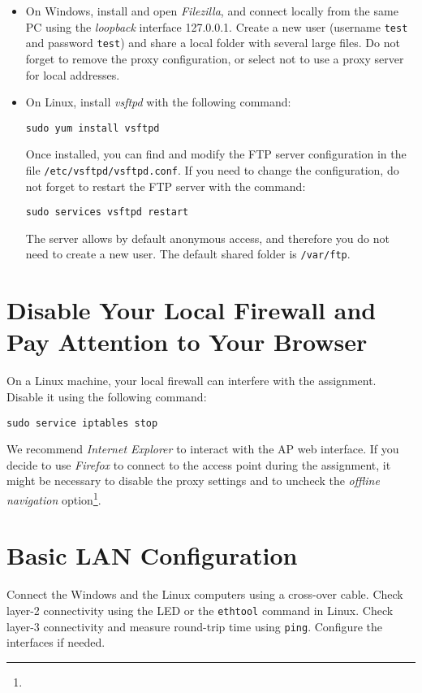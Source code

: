 \begin{itemize}

\item On Windows, install and open \emph{Filezilla}, and connect locally from the same PC using the \emph{loopback} interface 127.0.0.1. Create a new user (username \texttt{\color{blue}test} and password \texttt{\color{blue}test}) and share a local folder with several large files. Do not forget to remove the proxy configuration, or select not to use a proxy server for local addresses.

\item On Linux, install \emph{vsftpd} with the following command:
\begin{lstlisting}
sudo yum install vsftpd
\end{lstlisting}
    Once installed, you can find and modify the FTP server configuration in the file \texttt{/etc/vsftpd/vsftpd.conf}. If you need to change the configuration, do not forget to restart the FTP server with the command:
\begin{lstlisting}
sudo services vsftpd restart
\end{lstlisting}
    The server allows by default anonymous access, and therefore you do not need to create a new user. The default shared folder is \texttt{/var/ftp}.
\end{itemize}

\section{Disable Your Local Firewall and Pay Attention to Your Browser}

On a Linux machine, your local firewall can interfere with the assignment. Disable it using the following command:

\begin{lstlisting}
sudo service iptables stop
\end{lstlisting}

We recommend \emph{Internet Explorer} to interact with the AP web interface. If you decide to use \emph{Firefox} to connect to the access point during the assignment, it might be necessary to disable the proxy settings and to uncheck the \emph{offline navigation} option\footnote{}.

\section{Basic LAN Configuration}

Connect the Windows and the Linux computers using a cross-over cable. Check layer-2 connectivity using the LED or the \texttt{\color{blue}ethtool} command in Linux. Check layer-3 connectivity and measure round-trip time using \texttt{\color{blue}ping}. Configure the interfaces if needed.

